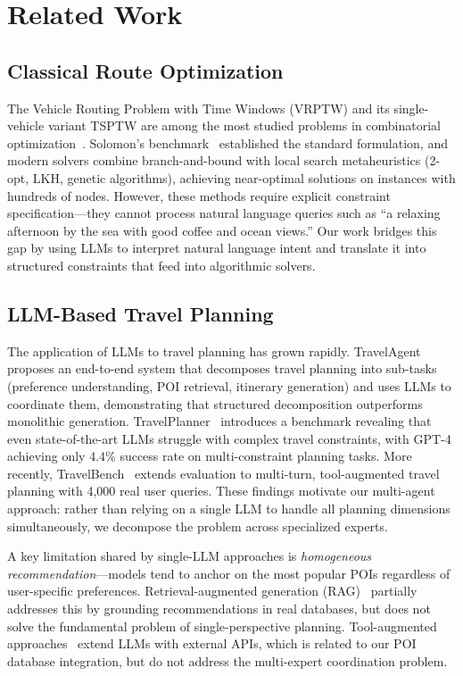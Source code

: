 \section{Related Work}
\label{sec:related_work}

\subsection{Classical Route Optimization}

The Vehicle Routing Problem with Time Windows (VRPTW) and its single-vehicle variant TSPTW are among the most studied problems in combinatorial optimization~\cite{toth2014vehicle}. Solomon's benchmark~\cite{solomon1987algorithms} established the standard formulation, and modern solvers combine branch-and-bound with local search metaheuristics (2-opt, LKH, genetic algorithms), achieving near-optimal solutions on instances with hundreds of nodes. However, these methods require explicit constraint specification---they cannot process natural language queries such as ``a relaxing afternoon by the sea with good coffee and ocean views.'' Our work bridges this gap by using LLMs to interpret natural language intent and translate it into structured constraints that feed into algorithmic solvers.

\subsection{LLM-Based Travel Planning}

The application of LLMs to travel planning has grown rapidly. TravelAgent~\cite{chen2024travelagent} proposes an end-to-end system that decomposes travel planning into sub-tasks (preference understanding, POI retrieval, itinerary generation) and uses LLMs to coordinate them, demonstrating that structured decomposition outperforms monolithic generation. TravelPlanner~\cite{xie2024travelplanner} introduces a benchmark revealing that even state-of-the-art LLMs struggle with complex travel constraints, with GPT-4 achieving only 4.4\% success rate on multi-constraint planning tasks. More recently, TravelBench~\cite{cheng2025travelbench} extends evaluation to multi-turn, tool-augmented travel planning with 4,000 real user queries. These findings motivate our multi-agent approach: rather than relying on a single LLM to handle all planning dimensions simultaneously, we decompose the problem across specialized experts.

A key limitation shared by single-LLM approaches is \textit{homogeneous recommendation}---models tend to anchor on the most popular POIs regardless of user-specific preferences. Retrieval-augmented generation (RAG)~\cite{lewis2020retrieval,gao2024retrieval} partially addresses this by grounding recommendations in real databases, but does not solve the fundamental problem of single-perspective planning. Tool-augmented approaches~\cite{qin2024toolllm} extend LLMs with external APIs, which is related to our POI database integration, but do not address the multi-expert coordination problem.

